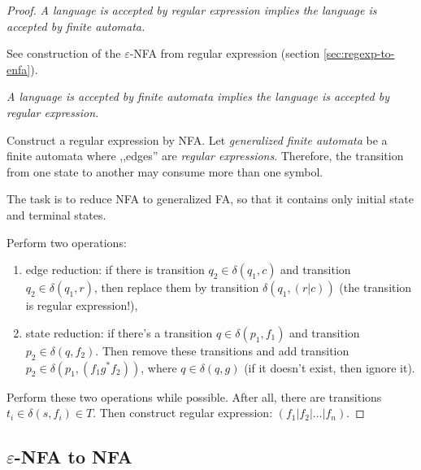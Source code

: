 \documentclass[a4paper]{article}
\theoremstyle{definition}
\begin{document}
\begin{proof}
\textit{A language is accepted by regular expression implies
  the language is accepted by finite automata.}

See construction of the \(\varepsilon\)-NFA from regular expression
(section \ref{sec:regexp-to-enfa}).

\textit{A language is accepted by finite automata implies
the language is accepted by regular expression.}

Construct a regular expression by NFA.
Let \textit{generalized finite automata} be
a finite automata where ,,edges'' are \textit{regular expressions}.
Therefore, the transition from one state to another may consume
more than one symbol.

The task is to reduce NFA to generalized FA,
so that it contains only initial state and terminal states.

Perform two operations:
\begin{enumerate}
  \item edge reduction:
    if there is transition \(q_2 \in \delta(q_1, c)\)
    and transition \(q_2 \in \delta(q_1, r)\), then
    replace them by transition \(\delta(q_1, (r|c))\) (the transition is regular
    expression!),
  \item state reduction:
    if there's a transition \(q \in \delta(p_1, f_1)\)
    and transition \(p_2 \in \delta(q, f_2)\).
    Then remove these transitions and
    add transition \(p_2 \in \delta(p_1, (f_1 g^* f_2))\), where
    \(q \in \delta(q, g)\) (if it doesn't exist, then ignore it).
\end{enumerate}
Perform these two operations while possible.
After all, there are transitions \(t_i \in \delta(s, f_i) \in T\).
Then construct regular expression: \((f_1 | f_2 | \ldots | f_n)\).
\end{proof}


\subsection{\(\varepsilon\)-NFA to NFA}
\end{document}

